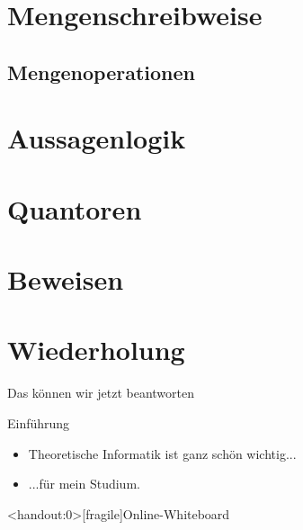 

\section{Mengenschreibweise}



\subsection{Mengenoperationen}



\section{Aussagenlogik}



\section{Quantoren}



\section{Beweisen}



\section{Wiederholung}
\begin{frame}[fragile]{Das können wir jetzt beantworten}
  \begin{alertblock}{Einführung}
    \begin{itemize}
      \item Theoretische Informatik ist ganz schön wichtig...
      \item ...für mein Studium.
    \end{itemize}
  \end{alertblock}
\end{frame}










\appendix

\begin{frame}<handout:0>[fragile]{Online-Whiteboard}
  \phantom{text}
\end{frame}


